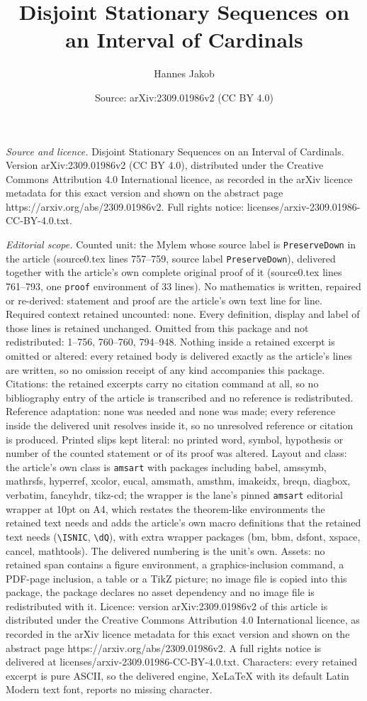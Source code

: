 \documentclass[10pt,a4paper]{amsart}
\title[Disjoint Stationary Sequences on an Interval of Cardinals]{Disjoint Stationary Sequences on an Interval of Cardinals}
\author{Hannes Jakob}
\date{Source: arXiv:2309.01986v2 (CC BY 4.0)}
\begin{document}
\maketitle

\noindent\emph{Source and licence.} Disjoint Stationary Sequences on an Interval of Cardinals. Version arXiv:2309.01986v2 (CC BY 4.0), distributed under the Creative Commons Attribution 4.0 International licence, as recorded in the arXiv licence metadata for this exact version and shown on the abstract page https://arxiv.org/abs/2309.01986v2. Full rights notice: licenses/arxiv-2309.01986-CC-BY-4.0.txt.\par\smallskip

\noindent\textit{Editorial scope.} Counted unit: the Mylem whose source label is \texttt{PreserveDown} in the article (source0.tex lines 757--759, source label \texttt{PreserveDown}), delivered together with the article's own complete original proof of it (source0.tex lines 761--793, one \texttt{proof} environment of 33 lines). No mathematics is written, repaired or re-derived: statement and proof are the article's own text line for line. Required context retained uncounted: none. Every definition, display and label of those lines is retained unchanged. Omitted from this package and not redistributed: 1--756, 760--760, 794--948. Nothing inside a retained excerpt is omitted or altered: every retained body is delivered exactly as the article's lines are written, so no omission receipt of any kind accompanies this package. Citations: the retained excerpts carry no citation command at all, so no bibliography entry of the article is transcribed and no reference is redistributed. Reference adaptation: none was needed and none was made; every reference inside the delivered unit resolves inside it, so no unresolved reference or citation is produced. Printed slips kept literal: no printed word, symbol, hypothesis or number of the counted statement or of its proof was altered. Layout and class: the article's own class is \texttt{amsart} with packages including babel, amssymb, mathrsfs, hyperref, xcolor, eucal, amsmath, amsthm, imakeidx, breqn, diagbox, verbatim, fancyhdr, tikz-cd; the wrapper is the lane's pinned \texttt{amsart} editorial wrapper at 10pt on A4, which restates the theorem-like environments the retained text needs and adds the article's own macro definitions that the retained text needs (\texttt{\textbackslash ISNIC}, \texttt{\textbackslash dQ}), with extra wrapper packages (bm, bbm, dsfont, xspace, cancel, mathtools). The delivered numbering is the unit's own. Assets: no retained span contains a figure environment, a graphics-inclusion command, a PDF-page inclusion, a table or a TikZ picture; no image file is copied into this package, the package declares no asset dependency and no image file is redistributed with it. Licence: version arXiv:2309.01986v2 of this article is distributed under the Creative Commons Attribution 4.0 International licence, as recorded in the arXiv licence metadata for this exact version and shown on the abstract page https://arxiv.org/abs/2309.01986v2. A full rights notice is delivered at licenses/arxiv-2309.01986-CC-BY-4.0.txt. Characters: every retained excerpt is pure ASCII, so the delivered engine, XeLaTeX with its default Latin Modern text font, reports no missing character.
\end{document}
